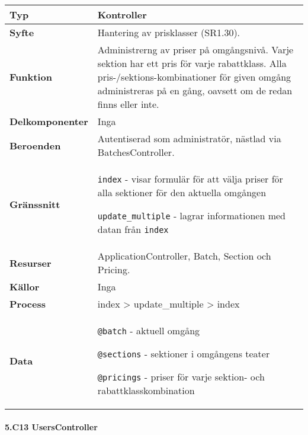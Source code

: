 \documentclass[a4paper, twoside, 11pt, titlepage]{article}
\begin{document}
			\begin {table} [ht] \begin{tabular} {  p{3.5cm} p{11.6cm} }
				\hline
				{\sffamily\textbf{Typ}} & {Kontroller} \\
				\hline
				{\sffamily\textbf{Syfte}} & {Hantering av prisklasser (SR1.30).} \\
				\hline
				{\sffamily\textbf{Funktion}} & {Administrerng av priser på omgångsnivå. Varje sektion har ett pris för varje rabattklass. Alla pris-/sektions-kombinationer för given omgång administreras på en gång, oavsett om de redan finns eller inte.} \\
				\hline
				{\sffamily\textbf{Delkomponenter}} & {Inga} \\
				\hline
				{\sffamily\textbf{Beroenden}} & {Autentiserad som administratör, nästlad via BatchesController.} \\
				\hline
				{\sffamily\textbf{Gränssnitt}} & {{\tt index} - visar formulär för att välja priser för alla sektioner för den aktuella omgången

{\tt update\_multiple} - lagrar informationen med datan från {\tt index}} \\
				\hline
				{\sffamily\textbf{Resurser}} & {ApplicationController, Batch, Section och Pricing.} \\
				\hline
				{\sffamily\textbf{Källor}} & {Inga} \\
				\hline
				{\sffamily\textbf{Process}} & {index > update\_multiple > index} \\
				\hline
				{\sffamily\textbf{Data}} & {{\tt @batch} - aktuell omgång

{\tt @sections} - sektioner i omgångens teater

{\tt @pricings} - priser för varje sektion- och rabattklasskombination} \\
				\hline
			\end{tabular} \end{table} \FloatBarrier


			\clearpage %
			\paragraph{5.C13 UsersController}\
\end{document}
